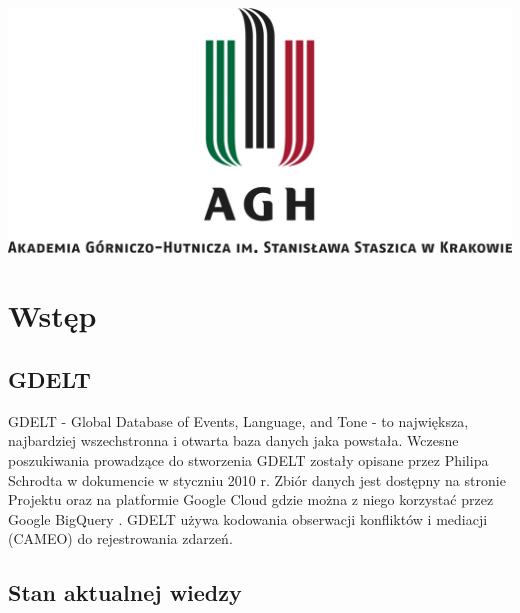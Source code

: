 \documentclass[11pt]{report}
\begin{document}
 \begin{titlepage}
 \centering
\includegraphics[width=0.8 \textwidth]{fig/AGH.jpg}
 \vspace{0.03\textheight}
 \bigskip
 \vspace{0.2\textheight}
 \par

 \vspace{0.1\textheight}
 \end{titlepage}


 \tableofcontents


 \chapter{Wstęp}
 
 \section{GDELT}
 GDELT - Global Database of Events, Language, and Tone - to największa, najbardziej wszechstronna i otwarta baza danych jaka powstała. Wczesne poszukiwania prowadzące do stworzenia GDELT zostały opisane przez Philipa Schrodta w dokumencie \cite{Schrodt2010} w styczniu 2010 r. Zbiór danych jest dostępny na stronie Projektu oraz na platformie Google Cloud gdzie można z niego korzystać przez Google BigQuery \cite{BigQuery2014}. GDELT używa kodowania obserwacji konfliktów i mediacji (CAMEO) \cite{GDELTDocumentation} do rejestrowania zdarzeń. 

 
 \section{Stan aktualnej wiedzy}
\end{document}
